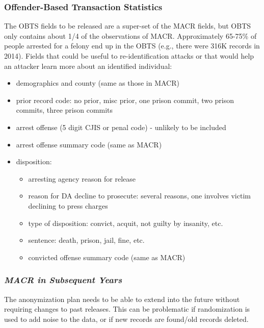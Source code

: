 \documentclass[]{article}
\providecommand{\tightlist}{%
  \setlength{\itemsep}{0pt}\setlength{\parskip}{0pt}}
\begin{document}
\subsubsection{Offender-Based Transaction
Statistics}\label{offender-based-transaction-statistics}

The OBTS fields to be released are a super-set of the MACR fields, but
OBTS only contains about 1/4 of the observations of MACR. Approximately
65-75\% of people arrested for a felony end up in the OBTS (e.g., there
were 316K records in 2014). Fields that could be useful to
re-identification attacks or that would help an attacker learn more
about an identified individual:

\begin{itemize}
\tightlist
\item
  demographics and county (same as those in MACR)
\item
  prior record code: no prior, misc prior, one prison commit, two prison
  commits, three prison commits
\item
  arrest offense (5 digit CJIS or penal code) - unlikely to be included
\item
  arrest offense summary code (same as MACR)
\item
  disposition:

  \begin{itemize}
  \tightlist
  \item
    arresting agency reason for release
  \item
    reason for DA decline to prosecute: several reasons, one involves
    victim declining to press charges
  \item
    type of disposition: convict, acquit, not guilty by insanity, etc.
  \item
    sentence: death, prison, jail, fine, etc.
  \item
    convicted offense summary code (same as MACR)
  \end{itemize}
\end{itemize}

\subsubsection{\texorpdfstring{\emph{MACR in Subsequent
Years}}{MACR in Subsequent Years}}\label{macr-in-subsequent-years}

The anonymization plan needs to be able to extend into the future
without requiring changes to past releases. This can be problematic if
randomization is used to add noise to the data, or if new records are
found/old records deleted.
\end{document}
